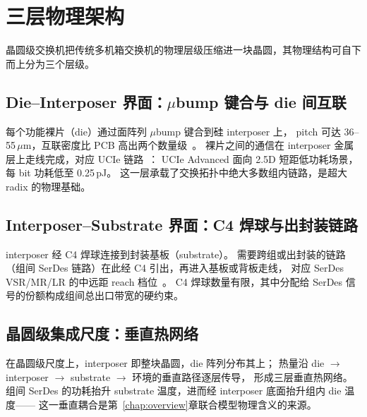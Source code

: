 \section{三层物理架构}\label{sec:bg-arch}

晶圆级交换机把传统多机箱交换机的物理层级压缩进一块晶圆，其物理结构可自下而上分为三个层级。

\subsection{Die--Interposer 界面：$\mu$bump 键合与 die 间互联}\label{sec:bg-die-interposer}

每个功能裸片（die）通过面阵列 $\mu$bump 键合到硅 interposer 上，
pitch 可达 36--55\,$\mu$m，互联密度比 PCB 高出两个数量级~\cite{ucie2.0-2024}。
裸片之间的通信在 interposer 金属层上走线完成，对应 UCIe 链路~\cite{ucie2.0-2024}：
UCIe Advanced 面向 2.5D 短距低功耗场景，每 bit 功耗低至 0.25\,pJ。
这一层承载了交换拓扑中绝大多数组内链路，是超大 radix 的物理基础。

\subsection{Interposer--Substrate 界面：C4 焊球与出封装链路}\label{sec:bg-interposer-substrate}

interposer 经 C4 焊球连接到封装基板（substrate）。
需要跨组或出封装的链路（组间 SerDes 链路）在此经 C4 引出，再进入基板或背板走线，
对应 SerDes VSR/MR/LR 的中远距 reach 档位~\cite{oif-cei-5.1}。
C4 焊球数量有限，其中分配给 SerDes 信号的份额构成组间总出口带宽的硬约束。

\subsection{晶圆级集成尺度：垂直热网络}\label{sec:bg-wafer-scale}

在晶圆级尺度上，interposer 即整块晶圆，die 阵列分布其上；
热量沿 die $\to$ interposer $\to$ substrate $\to$ 环境的垂直路径逐层传导，
形成三层垂直热网络。组间 SerDes 的功耗抬升 substrate 温度，进而经 interposer 底面抬升组内 die 温度——
这一垂直耦合是第~\ref{chap:overview}章联合模型物理含义的来源。
